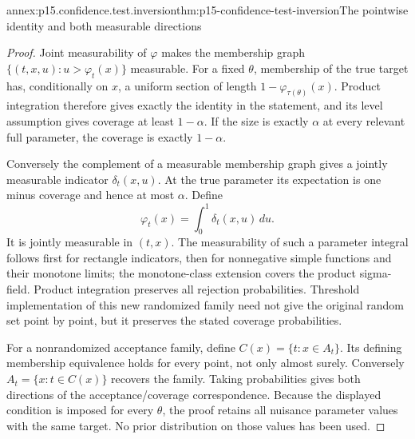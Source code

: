 \begin{annexitem}{annex:p15.confidence.test.inversion}{thm:p15-confidence-test-inversion}{The pointwise identity and both measurable directions}
\begin{proof}
Joint measurability of \(\varphi\)
makes the membership graph
\(\{(t,x,u):u>\varphi_t(x)\}\)
measurable. For a fixed \(\theta\),
membership of the true target
has, conditionally on \(x\), a
uniform section of length
\(1-\varphi_{\tau(\theta)}(x)\).
Product integration therefore gives
exactly the identity in the
statement, and its level assumption
gives coverage at least \(1-\alpha\).
If the size is exactly \(\alpha\)
at every relevant full parameter,
the coverage is exactly \(1-\alpha\).

Conversely the complement of a
measurable membership graph gives
a jointly measurable indicator
\(\delta_t(x,u)\).
At the true parameter its
expectation is one minus coverage
and hence at most \(\alpha\).
Define
\[
                      \varphi_t(x)
                          =\int_0^1\delta_t(x,u)\,du.
\]
It is jointly measurable in
\((t,x)\). The measurability
of such a parameter integral
follows first for rectangle
indicators, then for nonnegative
simple functions and their
monotone limits; the monotone-class
extension covers the product
sigma-field. Product integration
preserves all rejection probabilities.
Threshold implementation of this
new randomized family need not
give the original random set
point by point, but it preserves
the stated coverage probabilities.

For a nonrandomized acceptance
family, define \(C(x)=\{t:x\in A_t\}\).
Its defining membership equivalence
holds for every point, not only
almost surely. Conversely
\(A_t=\{x:t\in C(x)\}\)
recovers the family. Taking
probabilities gives both directions
of the acceptance/coverage
correspondence.
Because the displayed condition
is imposed for every \(\theta\),
the proof retains all nuisance
parameter values with the same
target. No prior distribution
on those values has been used.
\end{proof}
\end{annexitem}

